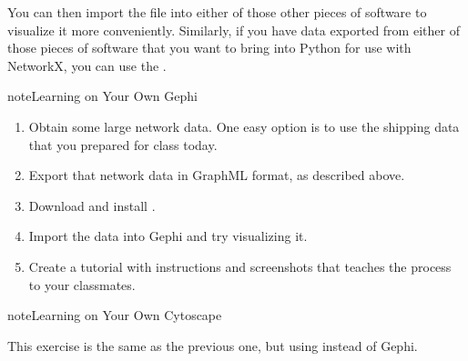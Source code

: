 \documentclass[letterpaper,10pt,english]{jupyterBook}
\begin{document}
\begin{sphinxVerbatim}[commandchars=\\\{\}]
   
\end{sphinxVerbatim}

\sphinxAtStartPar
You can then import the  file into either of those other pieces of software to visualize it more conveniently.  Similarly, if you have data exported from either of those pieces of software that you want to bring into Python for use with NetworkX, you can use the .

\begin{sphinxadmonition}{note}{Learning on Your Own \sphinxhyphen{} Gephi}
\begin{enumerate}
%
\item {} 
\sphinxAtStartPar
Obtain some large network data.  One easy option is to use the shipping data that you prepared for class today.

\item {} 
\sphinxAtStartPar
Export that network data in GraphML format, as described above.

\item {} 
\sphinxAtStartPar
Download and install .

\item {} 
\sphinxAtStartPar
Import the data into Gephi and try visualizing it.

\item {} 
\sphinxAtStartPar
Create a tutorial with instructions and screenshots that teaches the process to your classmates.

\end{enumerate}
\end{sphinxadmonition}

\begin{sphinxadmonition}{note}{Learning on Your Own \sphinxhyphen{} Cytoscape}

\sphinxAtStartPar
This exercise is the same as the previous one, but using  instead of Gephi.
\end{sphinxadmonition}
\end{document}
